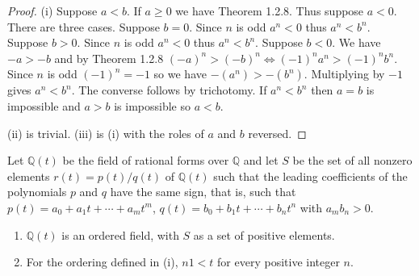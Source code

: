 \begin{proof}
    (i) Suppose $a < b$. If $a \ge 0$ we have Theorem 1.2.8.
    Thus suppose $a < 0$. There are three cases.
    Suppose $b = 0$.
    Since $n$ is odd $a^n < 0$ thus $a^n < b^n$.
    Suppose $b > 0$.
    Since $n$ is odd $a^n < 0$ thus $a^n < b^n$.
    Suppose $b < 0$.
    We have $-a > -b$ and by Theorem 1.2.8 
        $(-a)^n > (-b)^n \iff (-1)^n a^n > (-1)^n b^n$.
    Since $n$ is odd $(-1)^n = -1$ so we have $-(a^n) > -(b^n)$.
    Multiplying by $-1$ gives $a^n < b^n$.
    The converse follows by trichotomy. If $a^n < b^n$ then $a = b$ 
    is impossible and $a > b$ is impossible so $a < b$.


    (ii) is trivial.
    (iii) is (i) with the roles of $a$ and $b$ reversed.
\end{proof}


\begin{tcolorbox}[title=Problem 6, breakable]
    Let $\mathbb{Q}(t)$ be the field of rational forms over $\mathbb{Q}$ 
        and let $S$ be the set of all nonzero elements $r(t) = p(t)/q(t)$ of $\mathbb{Q}(t)$
        such that the leading coefficients of the polynomials $p$ and $q$ have the same sign,
        that is, such that $p(t) = a_0 + a_1 t + \cdots + a_m t^m$, $q(t) = b_0 + b_1 t + \cdots + b_n t^n$
        with $a_m b_n > 0$.
    \begin{enumerate}
        \item $\mathbb{Q}(t)$ is an ordered field, with $S$ as a set of positive elements.
        \item For the ordering defined in (i), $n1 < t$ for every positive integer $n$.
    \end{enumerate}
\end{tcolorbox}

